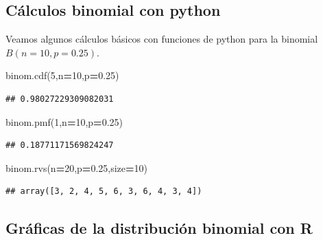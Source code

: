 \documentclass[]{book}
\newenvironment{Shaded}{\begin{snugshade}}{\end{snugshade}}
\newcommand{\DecValTok}[1]{\textcolor[rgb]{0.00,0.00,0.81}{#1}}
\newcommand{\FloatTok}[1]{\textcolor[rgb]{0.00,0.00,0.81}{#1}}
\newcommand{\NormalTok}[1]{#1}
\newcommand{\OperatorTok}[1]{\textcolor[rgb]{0.81,0.36,0.00}{\textbf{#1}}}
\begin{document}
\hypertarget{cuxe1lculos-binomial-con-python}{%
\subsection{Cálculos binomial con python}\label{cuxe1lculos-binomial-con-python}}

Veamos algunos cálculos básicos con funciones de python para la binomial \(B(n=10,p=0.25)\).

\begin{Shaded}
\begin{Highlighting}[]
\NormalTok{binom.cdf(}\DecValTok{5}\NormalTok{,n}\OperatorTok{=}\DecValTok{10}\NormalTok{,p}\OperatorTok{=}\FloatTok{0.25}\NormalTok{)}
\end{Highlighting}
\end{Shaded}

\begin{verbatim}
## 0.98027229309082031
\end{verbatim}

\begin{Shaded}
\begin{Highlighting}[]
\NormalTok{binom.pmf(}\DecValTok{1}\NormalTok{,n}\OperatorTok{=}\DecValTok{10}\NormalTok{,p}\OperatorTok{=}\FloatTok{0.25}\NormalTok{)}
\end{Highlighting}
\end{Shaded}

\begin{verbatim}
## 0.18771171569824247
\end{verbatim}

\begin{Shaded}
\begin{Highlighting}[]
\NormalTok{binom.rvs(n}\OperatorTok{=}\DecValTok{20}\NormalTok{,p}\OperatorTok{=}\FloatTok{0.25}\NormalTok{,size}\OperatorTok{=}\DecValTok{10}\NormalTok{)}
\end{Highlighting}
\end{Shaded}

\begin{verbatim}
## array([3, 2, 4, 5, 6, 3, 6, 4, 3, 4])
\end{verbatim}

\hypertarget{gruxe1ficas-de-la-distribuciuxf3n-binomial-con-r}{%
\subsection{Gráficas de la distribución binomial con R}\label{gruxe1ficas-de-la-distribuciuxf3n-binomial-con-r}}
\end{document}
